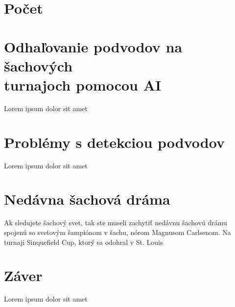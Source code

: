\documentclass[10pt,oneside,slovak,a4paper]{article}
\begin{document}
\section{Počet}


\section{Odhaľovanie podvodov na šachových\\
	 turnajoch pomocou AI}

Lorem ipsum dolor sit amet


\section{Problémy s detekciou podvodov}

Lorem ipsum dolor sit amet


\section{Nedávna šachová dráma}

Ak sledujete šachový svet, tak ste museli zachytiť nedávnu šachovú drámu spojenú so svetovým šampiónom v šachu, nórom Magnusom Carlsenom. Na turnaji Sinquefield Cup, ktorý sa odohral v St. Louis


\section{Záver}

Lorem ipsum dolor sit amet








\end{document}
